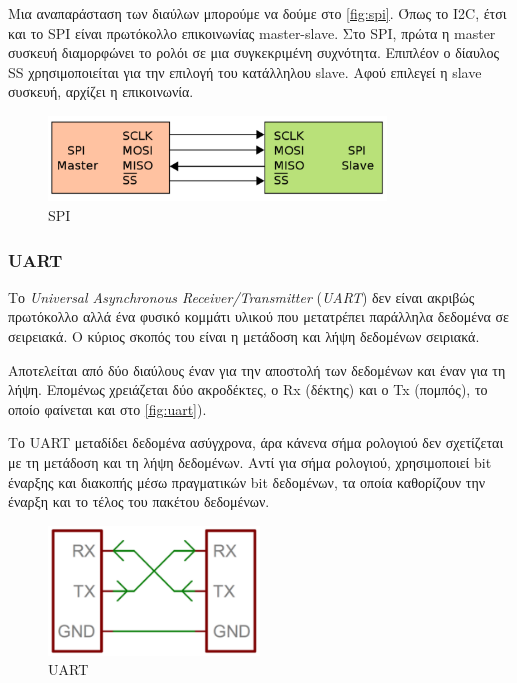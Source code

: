 Μια αναπαράσταση των διαύλων μπορούμε να δούμε στο \autoref{fig:spi}. Όπως το I2C, έτσι και το SPI είναι πρωτόκολλο επικοινωνίας master-slave. Στο SPI, πρώτα η master συσκευή διαμορφώνει το ρολόι σε μια συγκεκριμένη συχνότητα. Επιπλέον ο δίαυλος SS χρησιμοποιείται για την επιλογή του κατάλληλου slave. Αφού επιλεγεί η slave συσκευή, αρχίζει η επικοινωνία.

\begin{figure}[!ht]
	\centering
	\includegraphics[width=0.8\textwidth]{./images/chapter3/spi.png}
	\caption{SPI}
	\label{fig:spi}
\end{figure}

\subsubsection{UART}
\label{subsubsec:UART}

Το \textit{Universal Asynchronous Receiver/Transmitter} (\textit{UART}) δεν είναι ακριβώς πρωτόκολλο αλλά ένα φυσικό κομμάτι υλικού που μετατρέπει παράλληλα δεδομένα σε σειρειακά. Ο κύριος σκοπός του είναι η μετάδοση και λήψη δεδομένων σειριακά.

Αποτελείται από δύο διαύλους έναν για την αποστολή των δεδομένων και έναν για τη λήψη. Επομένως χρειάζεται δύο ακροδέκτες, ο Rx (δέκτης) και ο Tx (πομπός), το οποίο φαίνεται και στο \autoref{fig:uart}).

Το UART μεταδίδει δεδομένα ασύγχρονα, άρα κάνενα σήμα ρολογιού δεν σχετίζεται με τη μετάδοση και τη λήψη δεδομένων. Αντί για σήμα ρολογιού, χρησιμοποιεί bit έναρξης και διακοπής μέσω πραγματικών bit δεδομένων, τα οποία καθορίζουν την έναρξη και το τέλος του πακέτου δεδομένων.

\begin{figure}[!ht]
	\centering
	\includegraphics[width=0.5\textwidth]{./images/chapter3/uart.png}
	\caption{UART}
	\label{fig:uart}
\end{figure}